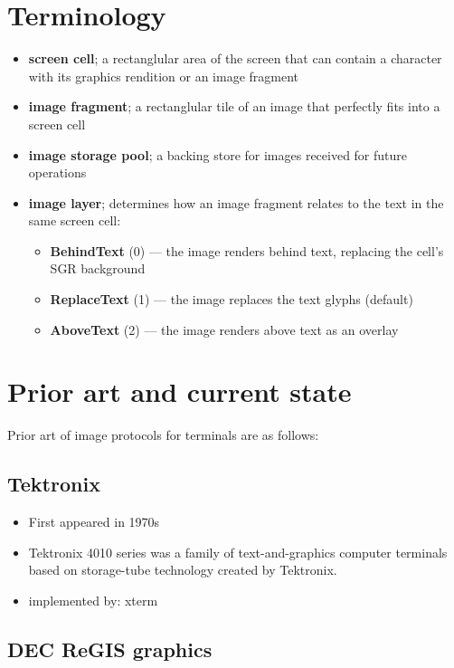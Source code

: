 \documentclass[a4paper]{article}
\begin{document}
\section{Terminology} %
\begin{itemize}
    \item \textbf{screen cell}; a rectanglular area of the screen that can contain a character with
        its graphics rendition or an image fragment
    \item \textbf{image fragment}; a rectanglular tile of an image that perfectly fits into a screen cell
    \item \textbf{image storage pool}; a backing store for images received for future operations
    \item \textbf{image layer}; determines how an image fragment relates to the text in the same screen cell:
        \begin{itemize}
            \item \textbf{BehindText} (0) --- the image renders behind text, replacing the cell's SGR background
            \item \textbf{ReplaceText} (1) --- the image replaces the text glyphs (default)
            \item \textbf{AboveText} (2) --- the image renders above text as an overlay
        \end{itemize}
\end{itemize}

\section{Prior art and current state} %

Prior art of image protocols for terminals are as follows:

\subsection{Tektronix}

\begin{itemize}
    \item First appeared in 1970s
    \item Tektronix 4010 series was a family of text-and-graphics computer terminals based on storage-tube technology created by Tektronix.
    \item implemented by: xterm
\end{itemize}

\subsection{DEC ReGIS graphics}
\end{document}
